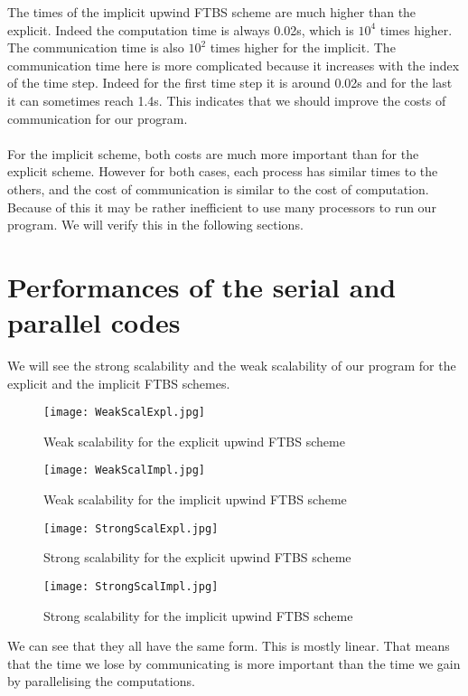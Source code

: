 \documentclass [10 pt, a4 paper]{report}
\begin{document}
\noindent
The times of the implicit upwind FTBS scheme are much higher than the explicit. Indeed the computation time is always 0.02s, which is $10^4$ times higher. The communication time is also $10^2$ times higher for the implicit. The communication time here is more complicated because it increases with the index of the time step. Indeed for the first time step it is around 0.02s and for the last it can sometimes reach 1.4s. This indicates that we should improve the costs of communication for our program.
\\ \\
For the implicit scheme, both costs are much more important than for the explicit scheme. However for both cases, each process has similar times to the others, and the cost of communication is similar to the cost of computation. Because of this it may be rather inefficient to use many processors to run our program. We will verify this in the following sections.



\section{Performances of the serial and parallel codes}
We will see the strong scalability and the weak scalability of our program for the explicit and the implicit FTBS schemes.

\begin{figure}[!htbp]
\centering
\texttt{[image: WeakScalExpl.jpg]}
\caption{\label{fig:image} Weak scalability for the explicit upwind FTBS scheme}
\end{figure}
\begin{figure}[!htbp]
\centering
\texttt{[image: WeakScalImpl.jpg]}
\caption{\label{fig:image} Weak scalability for the implicit upwind FTBS scheme}
\end{figure}
\begin{figure}[!htbp]
\centering
\texttt{[image: StrongScalExpl.jpg]}
\caption{\label{fig:image} Strong scalability for the explicit upwind FTBS scheme}
\end{figure}
\begin{figure}[!htbp]
\centering
\texttt{[image: StrongScalImpl.jpg]}
\caption{\label{fig:image} Strong scalability for the implicit upwind FTBS scheme}
\end{figure}

\noindent
We can see that they all have the same form. This is mostly linear. That means that the time we lose by communicating is more important than the time we gain by parallelising the computations. 
\end{document}
